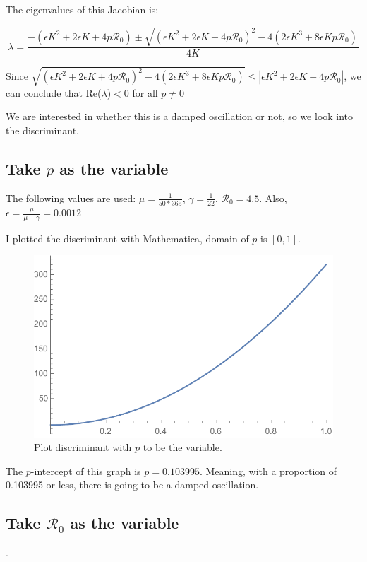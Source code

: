 \documentclass[12pt]{article}
\begin{document}
The eigenvalues of this Jacobian is:

\begin{equation}
\lambda = \frac{-(\epsilon K^2+2\epsilon K +4p\mathcal{R}_0) \pm \sqrt{(\epsilon K^2+2\epsilon K +4p\mathcal{R}_0)^2-4(2\epsilon K^3+8\epsilon Kp\mathcal{R}_0)}}{4K}
\end{equation}

Since $\sqrt{(\epsilon K^2+2\epsilon K +4p\mathcal{R}_0)^2-4(2\epsilon K^3+8\epsilon Kp\mathcal{R}_0)}\leq |\epsilon K^2+2\epsilon K +4p\mathcal{R}_0|$, we can conclude that Re($\lambda$)$<0$ for all $p\neq 0$

We are interested in whether this is a damped oscillation or not, so we look into the discriminant.

\subsection{Take $p$ as the variable}

The following values are used: $\mu=\frac{1}{50*365}$, $\gamma=\frac{1}{22}$, $\mathcal{R}_0=4.5$. Also, $\epsilon=\frac{\mu}{\mu+\gamma}=0.0012$

I plotted the discriminant with Mathematica, domain of $p$ is $[0,1]$.

\begin{figure}[H]
  \caption{Plot discriminant with $p$ to be the variable.}
  \centering
  \includegraphics[width=1.1\textwidth]{Figures/Discriminant_plot_newborn.pdf}
\end{figure}

The $p$-intercept of this graph is $p=0.103995$. Meaning, with a proportion of 0.103995 or less, there is going to be a damped oscillation.

\subsection{Take $\mathcal{R}_0$ as the variable}.
\end{document}
